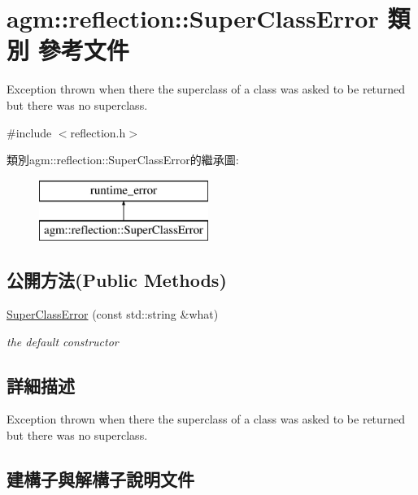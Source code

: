 \hypertarget{classagm_1_1reflection_1_1_super_class_error}{}\section{agm\+:\+:reflection\+:\+:Super\+Class\+Error 類別 參考文件}
\label{classagm_1_1reflection_1_1_super_class_error}


Exception thrown when there the superclass of a class was asked to be returned but there was no superclass.  




{\ttfamily \#include $<$reflection.\+h$>$}

類別agm\+:\+:reflection\+:\+:Super\+Class\+Error的繼承圖\+:\begin{figure}[H]
\begin{center}
\leavevmode
\includegraphics[height=2.000000cm]{classagm_1_1reflection_1_1_super_class_error}
\end{center}
\end{figure}
\subsection*{公開方法(Public Methods)}
\begin{DoxyCompactItemize}
\item 
\hyperlink{classagm_1_1reflection_1_1_super_class_error_ae3376846a79a64c307715f789ca3b3a8}{Super\+Class\+Error} (const std\+::string \&what)
\begin{DoxyCompactList}\small\item\em the default constructor \end{DoxyCompactList}\end{DoxyCompactItemize}


\subsection{詳細描述}
Exception thrown when there the superclass of a class was asked to be returned but there was no superclass. 

\subsection{建構子與解構子說明文件}
